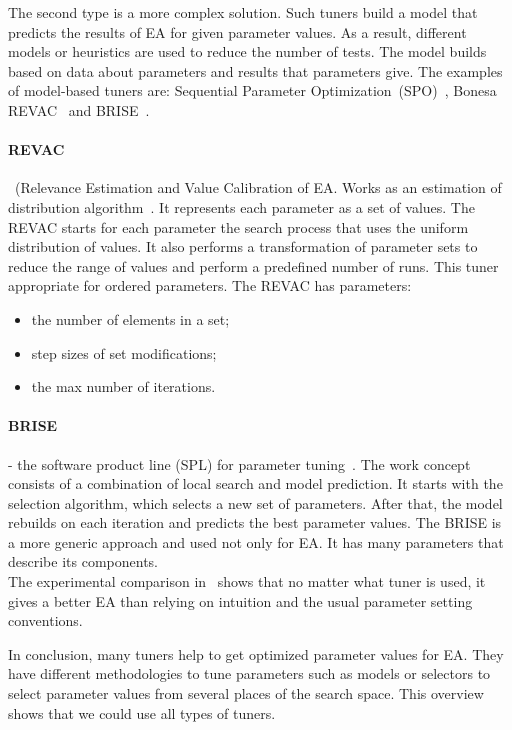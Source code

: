 The second type is a more complex solution. Such tuners build a model that predicts the results of EA for given parameter values. As a result, different models or heuristics are used to reduce the number of tests. The model builds based on data about parameters and results that parameters give. The examples of model-based tuners are: Sequential Parameter Optimization~(SPO)~\cite{bartz2004analysis}, Bonesa~\cite{smit2012parameter, bartz2005sequential} REVAC~\cite{nannen2007efficient} and BRISE~\cite{pukhkaiev2016, pukhkaiev19}.

\paragraph{REVAC}~(Relevance Estimation and Value Calibration of EA. Works as an estimation of distribution algorithm~\cite{pelikan2002, montero2012state}. It represents each parameter as a set of values. The REVAC starts for each parameter the search process that uses the uniform distribution of values. It also performs a transformation of parameter sets to reduce the range of values and perform a predefined number of runs. This tuner appropriate for ordered parameters. The REVAC has parameters:
\begin{itemize}
	\item the number of elements in a set;
	\item step sizes of set modifications;
	\item the max number of iterations.
\end{itemize} 

\paragraph{BRISE} - the software product line (SPL) for parameter tuning~\cite{pukhkaiev19}. The work concept consists of a combination of local search and model prediction. It starts with the selection algorithm, which selects a new set of parameters. After that, the model rebuilds on each iteration and predicts the best parameter values. The BRISE is a more generic approach and used not only for EA. It has many parameters that describe its components. \\

The experimental comparison in~\cite{smit2009comparing} shows that no matter what tuner is used, it gives a better EA than relying on intuition and the usual parameter setting conventions.

In conclusion, many tuners help to get optimized parameter values for EA. They have different methodologies to tune parameters such as models or selectors to select parameter values from several places of the search space. This overview shows that we could use all types of tuners. 

